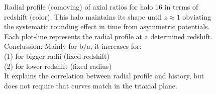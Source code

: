 \documentclass[a4paper,fleqn,usenatbib]{mnras}
\begin{document}
\begin{figure}
  \centering
  \hfill
  \caption{Radial profile (comoving) of axial ratios for halo 16 in terms of redshift (color). This halo maintains its shape until $z\approx 1$ obviating the systematic rounding effect in time from asymmetric potentials.\\
  
Each plot-line represents the radial profile at a determined redshift.\\
Conclussion: Mainly for b/a, it increases for:\\ (1) for bigger radii (fixed redshift) \\
												 (2) for lower redshift (fixed radius)\\

It explains the correlation between radial profile and history, but does not require that curves match in the triaxial plane.  }
  \label{fig:RedshiftGood}
\end{figure}
\end{document}
